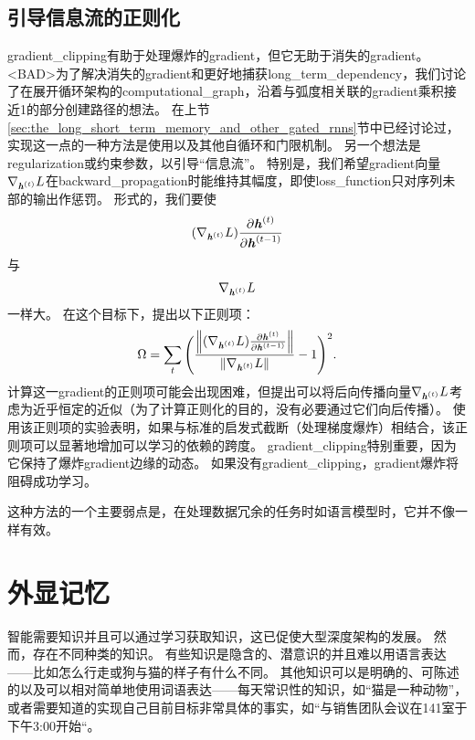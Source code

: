 \subsection{引导信息流的正则化}
\label{sec:regularizing_to_encourage_information_flow}
\gls{gradient_clipping}有助于处理爆炸的\gls{gradient}，但它无助于消失的\gls{gradient}。
<BAD>为了解决消失的\gls{gradient}和更好地捕获\gls{long_term_dependency}，我们讨论了在展开循环架构的\gls{computational_graph}，沿着与弧度相关联的\gls{gradient}乘积接近1的部分创建路径的想法。
在上节\ref{sec:the_long_short_term_memory_and_other_gated_rnns}节中已经讨论过，实现这一点的一种方法是使用以及其他自循环和门限机制。
另一个想法是\gls{regularization}或约束参数，以引导``信息流''。
特别是，我们希望\gls{gradient}向量$\nabla_{\boldsymbol{\mathit{h}}^{(t)}} L$在\gls{backward_propagation}时能维持其幅度，即使\gls{loss_function}只对序列未部的输出作惩罚。
形式的，我们要使
\begin{align}
 (\nabla_{\boldsymbol{\mathit{h}}^{(t)}} L) \frac{\partial \boldsymbol{\mathit{h}}^{(t)}}{\partial \boldsymbol{\mathit{h}}^{(t-1)}}
\end{align}
与
\begin{align}
\nabla_{\boldsymbol{\mathit{h}}^{(t)}} L 
\end{align}
一样大。
在这个目标下，\citep{Pascanu+al-ICML2013-small}提出以下正则项：
\begin{align}
 \Omega = \sum_t \Bigg(  \frac{
 \left\lVert (\nabla_{\boldsymbol{\mathit{h}}^{(t)}} L) \frac{\partial \boldsymbol{\mathit{h}}^{(t)}}{\partial \boldsymbol{\mathit{h}}^{(t-1)}}\right\rVert}
 {\left\lVert\nabla_{\boldsymbol{\mathit{h}}^{(t)}} L\right\rVert} -1 \Bigg)^2.
\end{align}
计算这一\gls{gradient}的正则项可能会出现困难，但\citep{Pascanu+al-ICML2013-small}提出可以将后向传播向量$\nabla_{\boldsymbol{\mathit{h}}^{(t)}} L$考虑为近乎恒定的近似（为了计算正则化的目的，没有必要通过它们向后传播）。
使用该正则项的实验表明，如果与标准的启发式截断（处理梯度爆炸）相结合，该正则项可以显著地增加可以学习的依赖的跨度。
\gls{gradient_clipping}特别重要，因为它保持了爆炸\gls{gradient}边缘的动态。
如果没有\gls{gradient_clipping}，\gls{gradient}爆炸将阻碍成功学习。

这种方法的一个主要弱点是，在处理数据冗余的任务时如语言模型时，它并不像一样有效。


\section{外显记忆}
\label{sec:explicit_memory}
智能需要知识并且可以通过学习获取知识，这已促使大型深度架构的发展。
然而，存在不同种类的知识。
有些知识是隐含的、潜意识的并且难以用语言表达——比如怎么行走或狗与猫的样子有什么不同。
其他知识可以是明确的、可陈述的以及可以相对简单地使用词语表达——每天常识性的知识，如``猫是一种动物''，或者需要知道的实现自己目前目标非常具体的事实，如``与销售团队会议在141室于下午3:00开始``。


